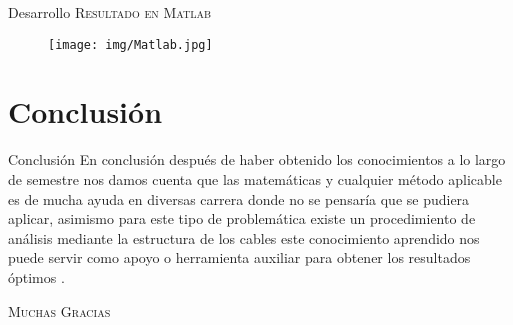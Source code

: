 \documentclass{cubeamer}
\begin{document}
\begin{frame}{Desarrollo}
    \textsc{Resultado en Matlab}
            \begin{figure}
                \centering
                \texttt{[image: img/Matlab.jpg]}
            \end{figure}
\end{frame}

\section{Conclusión}

\begin{frame}{Conclusión}
En conclusión después de haber obtenido los conocimientos a lo largo de semestre nos damos cuenta que las matemáticas y cualquier método aplicable es de mucha ayuda en diversas carrera donde no se pensaría que se pudiera aplicar, asimismo para este tipo de problemática existe un procedimiento de análisis mediante la estructura de los cables este conocimiento aprendido nos puede servir como apoyo o herramienta auxiliar para obtener los resultados óptimos .
\end{frame}

\begin{frame}[standout]
    \Huge\textsc{Muchas Gracias}
\end{frame}

\appendix
\end{document}

